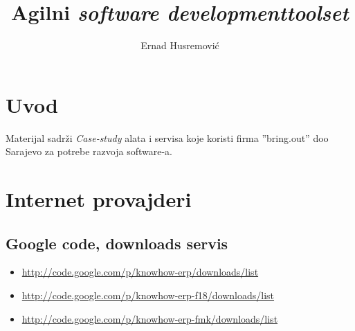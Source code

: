 \documentclass[times, utf8, seminar]{fit}
\begin{document}
\setlength{\parindent}{0pt}


\title{Agilni \emph{software development}\newline \emph{toolset}}

\author{Ernad Husremović}

\maketitle

\tableofcontents

\newpage

%
%


\chapter{Uvod}

Materijal sadrži \emph{Case-study}  alata i servisa koje koristi firma ''bring.out'' doo Sarajevo za potrebe razvoja software-a.

\chapter{Internet provajderi}

\section{Google code, downloads servis}

\begin{itemize}
  \item \url{http://code.google.com/p/knowhow-erp/downloads/list}
  \item \url{http://code.google.com/p/knowhow-erp-f18/downloads/list}
  \item \url{http://code.google.com/p/knowhow-erp-fmk/downloads/list}
\end{itemize}
\end{document}
